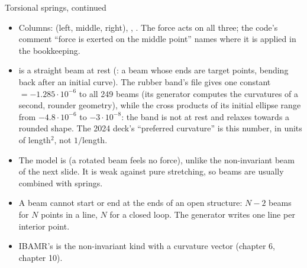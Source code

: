 \documentclass[aspectratio=169,11pt]{beamer}
\begin{document}
\begin{frame}{Torsional springs, continued}
\label{fr:beam2}
\small
\begin{itemize}
  \item Columns:  (left, middle, right), , . The force acts on all three; the code's comment ``force is exerted on the middle point'' names where it is applied in the bookkeeping.
  \item {} is a straight beam at rest (: a beam whose ends are target points, bending back after an initial curve). The rubber band's file gives one constant  $= -1.285 \cdot 10^{-6}$ to all 249 beams (its generator computes the curvatures of a second, rounder geometry), while the cross products of its initial ellipse range from $-4.8 \cdot 10^{-6}$ to $-3 \cdot 10^{-8}$: the band is not at rest and relaxes towards a rounded shape. The 2024 deck's ``preferred curvature'' is this number, in units of length$^2$, not $1/$length.
  \item The model is  (a rotated beam feels no force), unlike the non-invariant beam of the next slide. It is weak against pure stretching, so beams are usually combined with springs.
  \item A beam cannot start or end at the ends of an open structure: $N - 2$ beams for $N$ points in a line, $N$ for a closed loop. The generator writes one line per interior point.
  \item IBAMR's  is the non-invariant kind with a curvature vector (chapter 6, chapter 10).
\end{itemize}
\end{frame}
\end{document}
